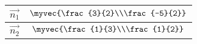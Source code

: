 \begin{tabular}{|c|c|}
\hline
	$\vec{n_1}$ & $\myvec{\frac{3}{2}\\\frac{-5}{2}}$\\
	\hline
	$\vec{n_2}$ & $\myvec{\frac{1}{3}\\\frac{1}{2}}$\\
	\hline
\end{tabular}
